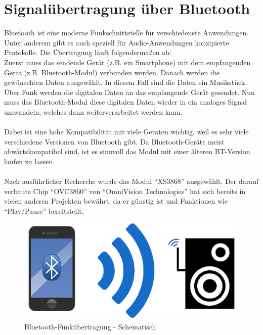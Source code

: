 \section{Signalübertragung über Bluetooth}\label{sec:3.3}
Bluetooth ist eine moderne Funkschnittstelle für verschiedenste Anwendungen.
Unter anderem gibt es auch speziell für Audio-Anwendungen konzipierte Protokolle.
Die Übertragung läuft folgendermaßen ab:
\\
Zuerst muss das sendende Gerät (z.B. ein Smartphone) mit dem empfangenden Gerät (z.B. Bluetooth-Modul) verbunden werden.
Danach werden die gewünschten Daten ausgewählt.
In diesem Fall sind die Daten ein Musikstück.
Über Funk werden die digitalen Daten an das empfangende Gerät gesendet.
Nun muss das Bluetooth-Modul diese digitalen Daten wieder in ein analoges Signal umwandeln, welches dann weiterverarbeitet werden kann.
\\ \\
Dabei ist eine hohe Kompatibilität mit viele Geräten wichtig, weil es sehr viele verschiedene Versionen von Bluetooth gibt.
Da Bluetooth-Geräte meist abwärtskompatibel sind, ist es sinnvoll das Modul mit einer älteren BT-Version laufen zu lassen.
\\ \\
Nach ausführlicher Recherche wurde das Modul \enquote{XS3868} ausgewählt.
Der darauf verbaute Chip \enquote{OVC3860} von \enquote{OmniVision Technologies} hat sich bereits in vielen anderen Projekten bewährt, da er günstig ist und Funktionen wie \enquote{Play/Pause} bereitstellt.

\begin{figure} [H]
	\centering
	\includegraphics[width=1\textwidth]{img/Grundlagen/Bluetooth/BT-uebertragung-cut.jpg}
	\caption{Bluetooth-Funkübertragung - Schematisch}
	\label{fig:3.3.1}
\end{figure}



